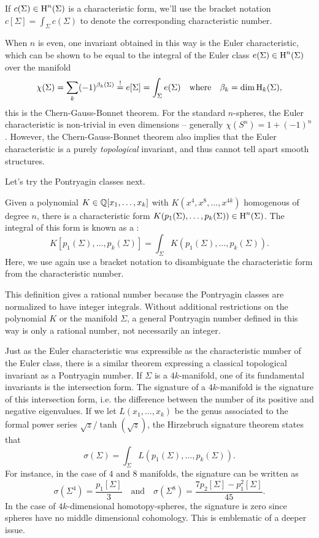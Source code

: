 \begin{note*}
  If $c(\Sigma)\in \operatorname{H}^n(\Sigma)$ is a characteristic form, we'll use the bracket notation $c[\Sigma]=\int_\Sigma c(\Sigma)$ to denote the corresponding characteristic number.
\end{note*}

When $n$ is even, one invariant obtained in this way is the Euler characteristic, which can be shown to be equal to the integral of the Euler class $e(\Sigma)\in \operatorname{H}^n(\Sigma)$ over the manifold
\[
  \chi(\Sigma) = \sum_k (-1)^{\beta_k(\Sigma)} \overset{!}{=} e[\Sigma] = \int_\Sigma e(\Sigma)\quad\textrm{where}\quad \beta_k = \dim \operatorname{H}_k(\Sigma),
\]
this is the Chern-Gauss-Bonnet theorem. For the standard $n$-spheres, the Euler characteristic is non-trivial in even dimensions -- generally $\chi(S^n)=1+(-1)^n$. However, the Chern-Gauss-Bonnet theorem also implies that the Euler characteristic is a purely \emph{topological} invariant, and thus cannot tell apart smooth structures.

Let's try the Pontryagin classes next. 

\begin{definition}\label{defn:pontryagin_number}
  Given a polynomial $K\in \mathbb{Q}[x_1,\ldots, x_k]$ with $K(x^4, x^8,\ldots, x^{4k})$ homogenous of degree $n$, there is a characteristic form $K(p_1(\Sigma), \ldots, p_k(\Sigma)) \in \operatorname{H}^n(\Sigma)$. The integral of this form is known as a
 :
\[
  K[p_1(\Sigma), \ldots, p_k(\Sigma)] = \int_{\Sigma} K(p_1(\Sigma), \ldots, p_k(\Sigma)).
\]
Here, we use again use a bracket notation to disambiguate the characteristic form from the characteristic number.
\end{definition}

\begin{remark}
  This definition gives a rational number because the Pontryagin classes are normalized to have integer integrals. Without additional restrictions on the polynomial $K$ or the manifold $\Sigma$, a general Pontryagin number defined in this way is only a rational number, not necessarily an integer.
\end{remark}

Just as the Euler characteristic was expressible as the characteristic number of the Euler class, there is a similar theorem expressing a classical topological invariant as a Pontryagin number. If $\Sigma$ is a $4k$-manifold, one of its fundamental invariants is the intersection form. The signature of a $4k$-manifold is the signature of this intersection form, i.e. the difference between the number of its positive and negative eigenvalues. If we let $L(x_1,\ldots, x_k)$ be the genus associated to the formal power series $\sqrt{z}/\tanh(\sqrt{z})$, the Hirzebruch signature theorem states that
\[
    \sigma(\Sigma) = \int_\Sigma L(p_1(\Sigma),\ldots, p_k(\Sigma)).
\]
For instance, in the case of $4$ and $8$ manifolds, the signature can be written as
\[
  \sigma(\Sigma^4) = \frac{p_1[\Sigma]}{3}
  \quad\textrm{and}\quad
  \sigma(\Sigma^8) = \frac{7p_2[\Sigma] - p_1^2[\Sigma]}{45}.
\]
In the case of $4k$-dimensional homotopy-spheres, the signature is zero since spheres have no middle dimensional cohomology. This is emblematic of a deeper issue.

